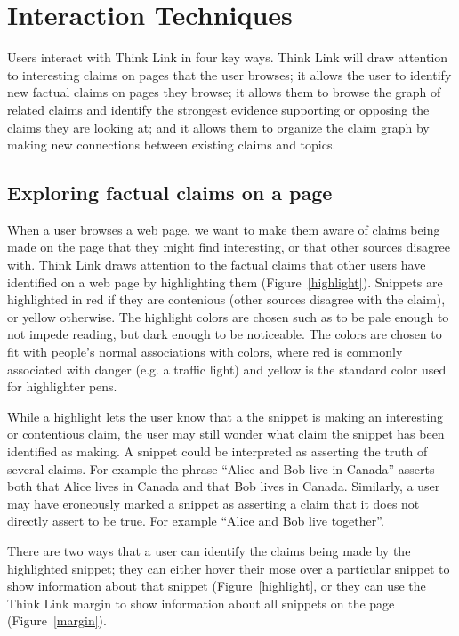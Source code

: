 \documentclass{chi2009}
\begin{document}
\section{Interaction Techniques}

Users interact with Think Link in four key ways. Think Link will draw attention to interesting claims on pages that the user browses; it allows the user to identify new factual claims on pages they browse; it allows them to browse the graph of related claims and identify the strongest evidence supporting or opposing the claims they are looking at; and it allows them to organize the claim graph by making new connections between existing claims and topics.

\subsection{Exploring factual claims on a page}

When a user browses a web page, we want to make them aware of claims being made on the page that they might find interesting, or that other sources disagree with. Think Link draws attention to the factual claims that other users have identified on a web page by highlighting them (Figure~\ref{highlight}). Snippets are highlighted in red if they are contenious (other sources disagree with the claim), or yellow otherwise. The highlight colors are chosen such as to be pale enough to not impede reading, but dark enough to be noticeable. The colors are chosen to fit with people's normal associations with colors, where red is commonly associated with danger (e.g. a traffic light) and yellow is the standard color used for highlighter pens.

While a highlight lets the user know that a the snippet is making an interesting or contentious claim, the user may still wonder what claim the snippet has been identified as making. A snippet could be interpreted as asserting the truth of several claims. For example the phrase ``Alice and Bob live in Canada'' asserts both that Alice lives in Canada and that Bob lives in Canada. Similarly, a user may have eroneously marked a snippet as asserting a claim that it does not directly assert to be true. For example ``Alice and Bob live together''.

There are two ways that a user can identify the claims being made by the highlighted snippet; they can either hover their mose over a particular snippet to show information about that snippet (Figure~\ref{highlight}, or they can use the Think Link margin to show information about all snippets on the page (Figure~\ref{margin}).
\end{document}
